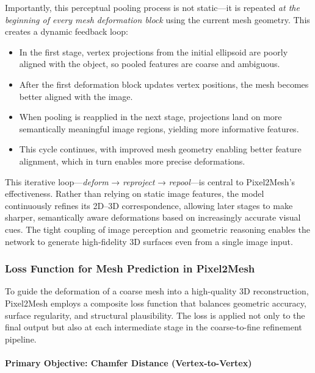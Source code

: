 Importantly, this perceptual pooling process is not static—it is repeated \emph{at the beginning of every mesh deformation block} using the current mesh geometry. This creates a dynamic feedback loop:

\begin{itemize}
    \item In the first stage, vertex projections from the initial ellipsoid are poorly aligned with the object, so pooled features are coarse and ambiguous.
    \item After the first deformation block updates vertex positions, the mesh becomes better aligned with the image.
    \item When pooling is reapplied in the next stage, projections land on more semantically meaningful image regions, yielding more informative features.
    \item This cycle continues, with improved mesh geometry enabling better feature alignment, which in turn enables more precise deformations.
\end{itemize}

This iterative loop—\emph{deform} → \emph{reproject} → \emph{repool}—is central to Pixel2Mesh’s effectiveness. Rather than relying on static image features, the model continuously refines its 2D–3D correspondence, allowing later stages to make sharper, semantically aware deformations based on increasingly accurate visual cues. The tight coupling of image perception and geometric reasoning enables the network to generate high-fidelity 3D surfaces even from a single image input.

\newpage

\subsubsection*{Loss Function for Mesh Prediction in Pixel2Mesh}

To guide the deformation of a coarse mesh into a high-quality 3D reconstruction, Pixel2Mesh employs a composite loss function that balances geometric accuracy, surface regularity, and structural plausibility. The loss is applied not only to the final output but also at each intermediate stage in the coarse-to-fine refinement pipeline.

\paragraph{Primary Objective: Chamfer Distance (Vertex-to-Vertex)}

